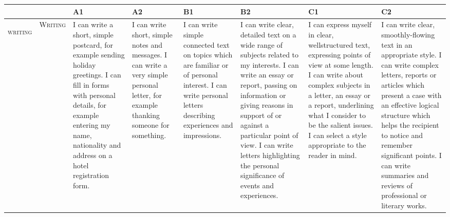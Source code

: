 \pagebreak

\begin{tabular}{|c|p{1.5cm}|p{2cm}|p{2cm}|p{2cm}|p{2cm}|p{2cm}|p{2cm}|} \hline
& & \textbf{A1} & \textbf{A2} & \textbf{B1} & \textbf{B2} & \textbf{C1} & \textbf{C2} \\ \hline

\multirow{1}{*}{\begin{sideways}\Large\scshape writing\end{sideways}} &

\small\scshape Writing &

\scriptsize I can write a short,
simple postcard,
for example
sending holiday
greetings. I can fill
in forms with
personal details,
for example
entering my name,
nationality and
address on a hotel
registration form. &

\scriptsize I can write short,
simple notes and
messages. I can
write a very simple
personal letter, for
example thanking
someone for
something. &

\scriptsize I can write simple
connected text on
topics which are
familiar or of
personal interest. I
can write personal
letters describing
experiences and
impressions. &

\scriptsize I can write clear,
detailed text on a
wide range of
subjects related to
my interests. I can
write an essay or
report, passing on
information or
giving reasons in
support of or
against a particular
point of view. I can
write letters
highlighting the
personal
significance of
events and
experiences. &

\scriptsize I can express
myself in clear,
wellstructured text,
expressing points
of view at some
length. I can write
about complex
subjects in a letter,
an essay or a
report, underlining
what I consider to
be the salient
issues. I can select
a style appropriate
to the reader in
mind. &

\scriptsize I can write clear,
smoothly-flowing
text in an
appropriate style. I
can write complex
letters, reports or
articles which
present a case with
an effective logical
structure which
helps the recipient
to notice and
remember
significant points. I
can write
summaries and
reviews of
professional or
literary works. \\ \hline

\end{tabular}